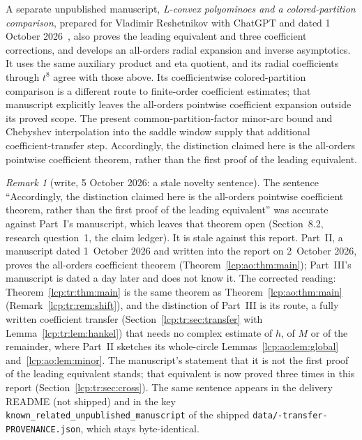 \documentclass[11pt]{article}
\numberwithin{equation}{section}
\theoremstyle{definition}\newtheorem{definition}[theorem]{Definition}
\theoremstyle{remark}\newtheorem{remark}[theorem]{Remark}
\begin{document}
A separate unpublished manuscript, \emph{L-convex polyominoes and a colored-partition comparison}, prepared for Vladimir Reshetnikov with ChatGPT and dated 1 October 2026~\cite{lcp-tr-earlier}, also proves the leading equivalent and three coefficient corrections, and develops an all-orders radial expansion and inverse asymptotics. It uses the same auxiliary product and eta quotient, and its radial coefficients through $t^8$ agree with those above. Its coefficientwise colored-partition comparison is a different route to finite-order coefficient estimates; that manuscript explicitly leaves the all-orders pointwise coefficient expansion outside its proved scope. The present common-partition-factor minor-arc bound and Chebyshev interpolation into the saddle window supply that additional coefficient-transfer step. Accordingly, the distinction claimed here is the all-orders pointwise coefficient theorem, rather than the first proof of the leading equivalent.

\begin{remark}[write, 5 October 2026: a stale novelty sentence]\label{lcp:tr:rem:novelty}
The sentence ``Accordingly, the distinction claimed here is the all-orders
pointwise coefficient theorem, rather than the first proof of the leading
equivalent'' was accurate against Part~I's manuscript, which leaves that
theorem open (Section~8.2, research question~1, the claim ledger). It is
stale against this report. Part~II, a manuscript dated 1~October 2026 and
written into the report on 2~October 2026, proves the all-orders
coefficient theorem (Theorem~\ref{lcp:ao:thm:main}); Part~III's manuscript
is dated a day later and does not know it. The corrected reading:
Theorem~\ref{lcp:tr:thm:main} is the same theorem as
Theorem~\ref{lcp:ao:thm:main} (Remark~\ref{lcp:tr:rem:shift}), and the
distinction of Part~III is its route, a fully written coefficient transfer
(Section~\ref{lcp:tr:sec:transfer} with Lemma~\ref{lcp:tr:lem:hankel}) that
needs no complex estimate of $h$, of $M$ or of the remainder, where
Part~II sketches its whole-circle Lemmas~\ref{lcp:ao:lem:global}
and~\ref{lcp:ao:lem:minor}. The manuscript's statement that it is not the
first proof of the leading equivalent stands; that equivalent is now proved
three times in this report (Section~\ref{lcp:tr:sec:cross}). The same
sentence appears in the delivery README (not shipped) and in the key
\texttt{known\_related\_unpublished\_manuscript} of the shipped
\texttt{data/-transfer-PROVENANCE.json}, which stays
byte-identical.
\end{remark}
\end{document}
